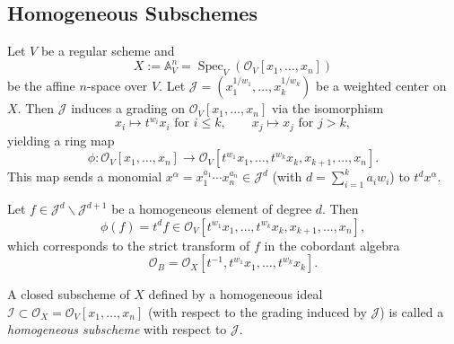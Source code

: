 \documentclass{amsart}
\newcommand{\GG}{{\mathbb{G}}}
\renewcommand{\AA}{{\mathbb{A}}}
\newcommand{\cI}{{\mathcal I}}
\newcommand{\cJ}{{\mathcal J}}
\newcommand{\cO}{{\mathcal O}}
\newcommand{\Spec}{\operatorname{Spec}}
\renewcommand{\setminus}{\smallsetminus}
\begin{document}
	

\subsection{Homogeneous Subschemes} \label{homog}

Let $V$ be a regular scheme and 
\[
X := \mathbb{A}^n_V = \Spec_V(\cO_V[x_1, \ldots, x_n])
\]
be the affine $n$-space over $V$. Let $\cJ = (x_1^{1/w_1}, \ldots, x_k^{1/w_k})$ be a weighted center on $X$. Then $\cJ$ induces a grading on $\cO_V[x_1,\ldots,x_n]$ via the isomorphism
\[
x_i \mapsto t^{w_i}x_i \text{ for } i \leq k, \qquad x_j \mapsto x_j \text{ for } j > k,
\]
yielding a ring map
\[
\phi: \cO_V[x_1, \ldots, x_n] \to \cO_V[t^{w_1}x_1, \ldots, t^{w_k}x_k, x_{k+1}, \ldots, x_n].
\]
This map sends a monomial $x^\alpha = x_1^{a_1} \cdots x_n^{a_n} \in \cJ^d$ (with $d = \sum_{i=1}^k a_i w_i$) to $t^d x^\alpha$.

Let $f \in \cJ^d \setminus \cJ^{d+1}$ be a homogeneous element of degree $d$. Then
\[
\phi(f) = t^d f \in \cO_V[t^{w_1}x_1, \ldots, t^{w_k}x_k, x_{k+1}, \ldots, x_n],
\]
which corresponds to the strict transform of $f$ in the cobordant algebra
\[
\cO_B = \cO_X[t^{-1}, t^{w_1}x_1, \ldots, t^{w_k}x_k].
\]

\begin{definition}
A closed subscheme of $X$ defined by a homogeneous ideal $\cI \subset \cO_X=\cO_V[x_1, \ldots, x_n]$ (with respect to the grading induced by $\cJ$) is called a \emph{homogeneous subscheme} with respect to $\cJ$.
\end{definition}
\end{document}

